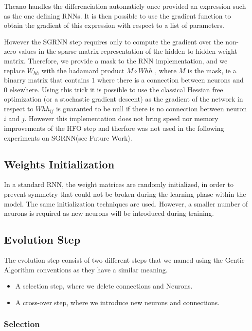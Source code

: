 Theano handles the differenciation automaticly once provided an expression such as the one defining RNNs. It is then possible to use the gradient function to obtain the gradient of this expression with respect to a list of parameters.

However the SGRNN step requires only to compute the gradient over the non-zero values in the sparse matrix representation of the hidden-to-hidden weight matrix. Therefore, we provide a mask to the RNN implementation, and we replace $W_{hh}$ with the hadamard product $M \circ  Whh$ , where $M$ is the mask, ie a binarry matrix that contains $1$ where there is a connection between neurons and $0$ elsewhere. Using this trick it is possible to use the classical Hessian free optimization (or a stochastic gradient descent) as the gradient of the network in respect to $Whh_{ij}$ is guaranted to be null if there is no connection between neuron $i$ and $j$. However this implementation does not bring speed nor memory improvements of the HFO step and therfore was not used in the following experiments on SGRNN(see Future Work).


\subsection{Weights Initialization}

    In a standard RNN, the weight matrices are randomly initialized, in order to prevent symmetry that could not be broken during the learning phase within the model. The same initialization techniques are used. However, a smaller number of neurons is required as new neurons will be introduced during training.  

\subsection{Evolution Step}

The evolution step consist of two different steps that we named using the Gentic Algorithm conventions as they have a similar meaning. 
\begin{itemize}
    \item A selection step, where we delete connections and Neurons.
    \item A cross-over step, where we introduce new neurons and connections. 
\end{itemize}

\subsubsection{Selection}

